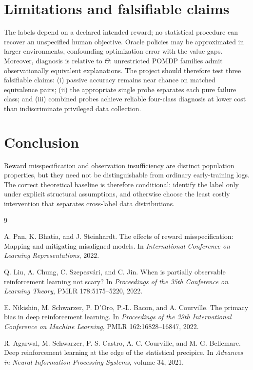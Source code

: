 \documentclass[9pt,twocolumn]{extarticle}
\begin{document}
\section{Limitations and falsifiable claims}

The labels depend on a declared intended reward; no statistical procedure can
recover an unspecified human objective. Oracle policies may be approximated in
larger environments, confounding optimization error with the value gaps.
Moreover, diagnosis is relative to $\Theta$: unrestricted POMDP families admit
observationally equivalent explanations. The project should therefore test
three falsifiable claims: (i) passive accuracy remains near chance on matched
equivalence pairs; (ii) the appropriate single probe separates each pure
failure class; and (iii) combined probes achieve reliable four-class diagnosis
at lower cost than indiscriminate privileged data collection.

\section{Conclusion}

Reward misspecification and observation insufficiency are distinct population
properties, but they need not be distinguishable from ordinary early-training
logs. The correct theoretical baseline is therefore conditional: identify the
label only under explicit structural assumptions, and otherwise choose the
least costly intervention that separates cross-label data distributions.

\begin{thebibliography}{9}
\small

A. Pan, K. Bhatia, and J. Steinhardt.
\newblock The effects of reward misspecification: Mapping and mitigating
misaligned models.
\newblock In \emph{International Conference on Learning Representations},
2022.

Q. Liu, A. Chung, C. Szepesv\'ari, and C. Jin.
\newblock When is partially observable reinforcement learning not scary?
\newblock In \emph{Proceedings of the 35th Conference on Learning Theory},
PMLR 178:5175--5220, 2022.

E. Nikishin, M. Schwarzer, P. D'Oro, P.-L. Bacon, and A. Courville.
\newblock The primacy bias in deep reinforcement learning.
\newblock In \emph{Proceedings of the 39th International Conference on Machine
Learning}, PMLR 162:16828--16847, 2022.

R. Agarwal, M. Schwarzer, P. S. Castro, A. C. Courville, and M. G. Bellemare.
\newblock Deep reinforcement learning at the edge of the statistical
precipice.
\newblock In \emph{Advances in Neural Information Processing Systems},
volume 34, 2021.

\end{thebibliography}
\end{document}

